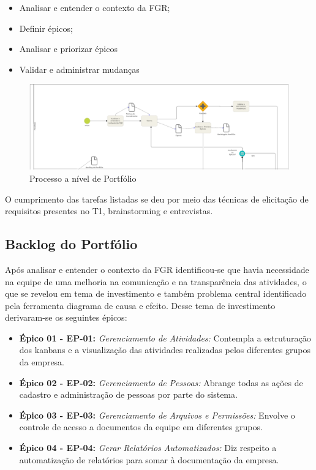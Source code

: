 \begin{itemize}
  \item Analisar e entender o contexto da FGR;
  \item Definir épicos;
  \item Analisar e priorizar épicos
  \item Validar e administrar mudanças
\end{itemize}

\pagebreak

\begin{figure}[!h]
        \centering
        \includegraphics[keepaspectratio=true,scale=0.42]{figuras/prog.eps}
        \caption{Processo a nível de Portfólio}
\end{figure}

O cumprimento das tarefas listadas se deu por meio das técnicas de elicitação de requisitos presentes no T1,
 brainstorming e entrevistas.

\subsection{Backlog do Portfólio}

Após analisar e entender o contexto da FGR identificou-se que havia necessidade na equipe de uma melhoria na comunicação
 e na transparência das atividades, o que se revelou em tema de investimento e também problema central identificado pela
  ferramenta diagrama de causa e efeito. Desse tema de investimento derivaram-se os seguintes épicos:

\begin{itemize}
  \item \textbf{Épico 01 - EP-01:} \textit{Gerenciamento de Atividades:} Contempla a estruturação dos kanbans e a visualização das atividades realizadas pelos diferentes grupos da empresa.
  \item \textbf{Épico 02 - EP-02:} \textit{Gerenciamento de Pessoas:} Abrange todas as ações de cadastro e administração de pessoas por parte do sistema.
  \item \textbf{Épico 03 - EP-03:} \textit{Gerenciamento de Arquivos e Permissões:} Envolve o controle de acesso a documentos da equipe em diferentes grupos.
  \item \textbf{Épico 04 - EP-04:} \textit{Gerar Relatórios Automatizados:} Diz respeito a automatização de relatórios para somar à documentação da empresa.
\end{itemize}
